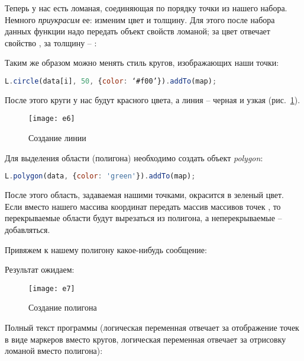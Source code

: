 Теперь у нас есть ломаная, соединяющая по порядку точки из нашего набора. 
Немного \emph{приукрасим} ее: изменим цвет и толщину. Для этого после набора 
данных  функции надо передать объект свойств ломаной; за цвет отвечает 
свойство , за толщину -- :


Таким же образом можно менять стиль кругов, изображающих наши точки:
\begin{lstlisting}[language=js]
    L.circle(data[i], 50, {color: ‘#f00’}).addTo(map);
\end{lstlisting}

После этого круги у нас будут красного цвета, а линия -- черная и узкая
(рис.~\ref{pic:e6}).
\begin{figure}[ht!]
    \center
    \texttt{[image: e6]}
    \caption{Создание линии}
    \label{pic:e6}
\end{figure}

Для выделения области (полигона) необходимо создать объект \emph{polygon}:
\begin{lstlisting}[language=js]
    L.polygon(data, {color: 'green'}).addTo(map);
\end{lstlisting}
После этого область, задаваемая нашими точками, окрасится в зеленый цвет.
Если вместо нашего массива координат  передать массив массивов
точек , то перекрываемые области будут
вырезаться из полигона, а неперекрываемые -- добавляться.

Привяжем к нашему полигону какое-нибудь сообщение:


Результат ожидаем:
\begin{figure}[ht!]
    \center
    \texttt{[image: e7]}
    \caption{Создание полигона}
    \label{pic:e7}
\end{figure}

Полный текст программы (логическая переменная  отвечает за 
отображение точек в виде маркеров вместо кругов, логическая переменная 
 отвечает за отрисовку ломаной вместо полигона):


\newpage

